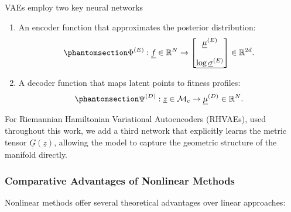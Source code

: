 \documentclass[
]{scrartcl}
\begin{document}
\begin{refsection}
VAEs employ two key neural networks

\begin{enumerate}
\def\labelenumi{\arabic{enumi}.}
\item
  An encoder function that approximates the posterior distribution:
  \begin{equation}\phantomsection\label{eq-encoder}{
  \Phi^{(E)}: \underline{f} \in \mathbb{R}^N \rightarrow
  \left[\begin{matrix}
  \underline{\mu}^{(E)} \\ \\
  \underline{\log \underline{\sigma}^{(E)}}
  \end{matrix}\right] \in \mathbb{R}^{2d}.
  }\end{equation}
\item
  A decoder function that maps latent points to fitness profiles:
  \begin{equation}\phantomsection\label{eq-decoder}{
  \Psi^{(D)}: 
  \underline{z} \in \mathcal{M}_c \rightarrow 
  \underline{\mu}^{(D)} \in \mathbb{R}^N.
  }\end{equation}
\end{enumerate}

For Riemannian Hamiltonian Variational Autoencoders (RHVAEs), used
throughout this work, we add a third network that explicitly learns the
metric tensor \(\underline{\underline{G}}(\underline{z})\), allowing the
model to capture the geometric structure of the manifold directly.

\subsubsection{Comparative Advantages of Nonlinear
Methods}\label{comparative-advantages-of-nonlinear-methods}

Nonlinear methods offer several theoretical advantages over linear
approaches:


\end{refsection}
\end{document}
